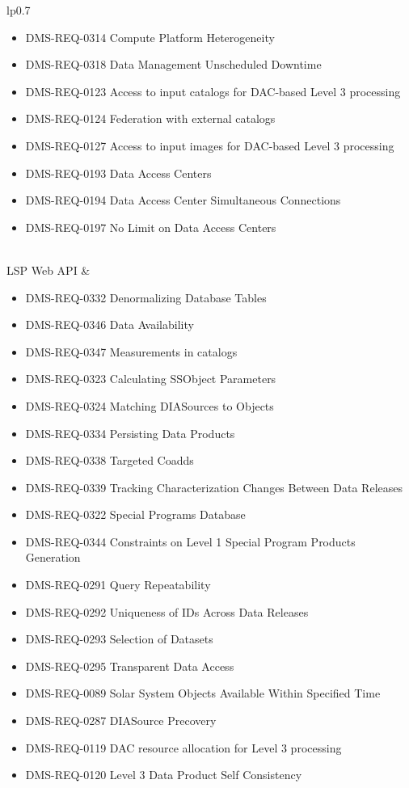 \begin{xtabular}{lp{0.7\textwidth}}
\begin{itemize}
\item DMS-REQ-0314 Compute Platform Heterogeneity
\item DMS-REQ-0318 Data Management Unscheduled Downtime
\item DMS-REQ-0123 Access to input catalogs for DAC-based Level 3 processing
\item DMS-REQ-0124 Federation with external catalogs
\item DMS-REQ-0127 Access to input images for DAC-based Level 3 processing
\item DMS-REQ-0193 Data Access Centers
\item DMS-REQ-0194 Data Access Center Simultaneous Connections
\item DMS-REQ-0197 No Limit on Data Access Centers
\end{itemize} \\ \hline
LSP Web API &
\begin{itemize}DMS-REQ-0331 Computing Derived Quantities
\item DMS-REQ-0332 Denormalizing Database Tables
\item DMS-REQ-0346 Data Availability
\item DMS-REQ-0347 Measurements in catalogs
\item DMS-REQ-0323 Calculating SSObject Parameters
\item DMS-REQ-0324 Matching DIASources to Objects
\item DMS-REQ-0334 Persisting Data Products
\item DMS-REQ-0338 Targeted Coadds
\item DMS-REQ-0339 Tracking Characterization Changes Between Data Releases
\item DMS-REQ-0322 Special Programs Database
\item DMS-REQ-0344 Constraints on Level 1 Special Program Products Generation
\item DMS-REQ-0291 Query Repeatability
\item DMS-REQ-0292 Uniqueness of IDs Across Data Releases
\item DMS-REQ-0293 Selection of Datasets
\item DMS-REQ-0295 Transparent Data Access
\item DMS-REQ-0089 Solar System Objects Available Within Specified Time
\item DMS-REQ-0287 DIASource Precovery
\item DMS-REQ-0119 DAC resource allocation for Level 3 processing
\item DMS-REQ-0120 Level 3 Data Product Self Consistency

\end{itemize}
\end{xtabular}
